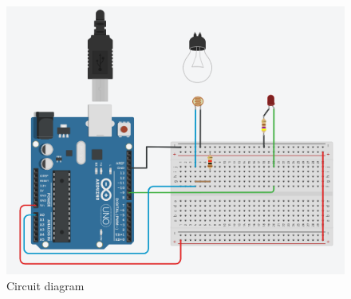 \begin{figure}[H]
    \centering
    \includegraphics[scale=0.6]{Figures/light-transmission}
    \caption{Circuit diagram}
    \label{fig:my_label}
\end{figure}

